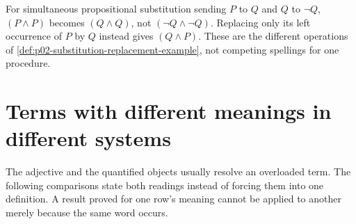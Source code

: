 For simultaneous propositional substitution sending \(P\) to \(Q\)
and \(Q\) to \(\neg Q\), \((P\land P)\) becomes \((Q\land Q)\),
not \((\neg Q\land\neg Q)\). Replacing only its left occurrence of
\(P\) by \(Q\) instead gives \((Q\land P)\).
These are the different operations of
\cref{def:p02-substitution-replacement-example}, not competing spellings
for one procedure.

\section{Terms with different meanings in different systems}
\label{sec:p14-glossary-overloads}

The adjective and the quantified objects usually resolve an overloaded term.
The following comparisons state both readings instead of forcing them into
one definition. A result proved for one row's meaning cannot be applied to
another merely because the same word occurs.


